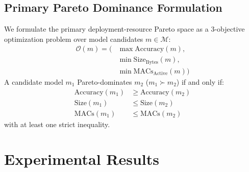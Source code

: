\documentclass[journal,10pt]{IEEEtran}
\begin{document}
\subsection{Primary Pareto Dominance Formulation}
We formulate the primary deployment-resource Pareto space as a 3-objective optimization problem over model candidates $m \in \mathcal{M}$:
\begin{equation}
\begin{aligned}
    \mathcal{O}(m) = \Big( &\max \text{Accuracy}(m), \\
                           &\min \text{Size}_{\text{Bytes}}(m), \\
                           &\min \text{MACs}_{\text{Active}}(m) \Big)
\end{aligned}
\end{equation}
A candidate model $m_1$ Pareto-dominates $m_2$ ($m_1 \succ m_2$) if and only if:
\begin{equation}
\begin{aligned}
    \text{Accuracy}(m_1) &\ge \text{Accuracy}(m_2) \\
    \text{Size}(m_1) &\le \text{Size}(m_2) \\
    \text{MACs}(m_1) &\le \text{MACs}(m_2)
\end{aligned}
\end{equation}
with at least one strict inequality.

\section{Experimental Results}
\end{document}
